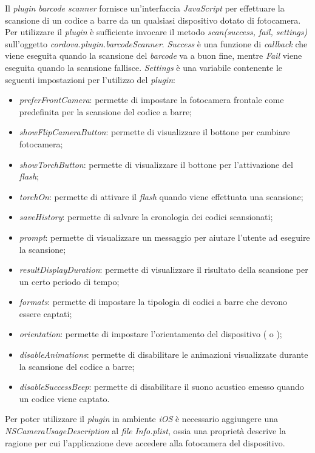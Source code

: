 Il \textit{plugin} \textit{barcode scanner} fornisce un'interfaccia \textit{JavaScript} per effettuare la scansione di un codice a barre da un qualsiasi dispositivo dotato di fotocamera. Per utilizzare il \textit{plugin} è sufficiente invocare il metodo \textit{scan(success, fail, settings)} sull'oggetto \textit{cordova.plugin.barcodeScanner}. \textit{Success} è una funzione di \textit{callback} che viene eseguita quando la scansione del \textit{barcode} va a buon fine, mentre \textit{Fail} viene eseguita quando la scansione fallisce. \textit{Settings} è una variabile contenente le seguenti impostazioni per l'utilizzo del \textit{plugin}:
\begin{itemize}
	\item \textit{preferFrontCamera}: permette di impostare la fotocamera frontale come predefinita per la scansione del codice a barre;
	\item \textit{showFlipCameraButton}: permette di visualizzare il bottone per cambiare fotocamera;
	\item \textit{showTorchButton}: permette di visualizzare il bottone per l'attivazione del \textit{flash};
	\item \textit{torchOn}: permette di attivare il \textit{flash} quando viene effettuata una scansione;
	\item \textit{saveHistory}: permette di salvare la cronologia dei codici scansionati;
	\item \textit{prompt}: permette di visualizzare un messaggio per aiutare l'utente ad eseguire la scansione;
	\item \textit{resultDisplayDuration}: permette di visualizzare il risultato della scansione per un certo periodo di tempo;
	\item \textit{formats}: permette di impostare la tipologia di codici a barre che devono essere captati;
	\item \textit{orientation}: permette di impostare l'orientamento del dispositivo ( o );
	\item \textit{disableAnimations}: permette di disabilitare le animazioni visualizzate durante la scansione del codice a barre;
	\item \textit{disableSuccessBeep}: permette di disabilitare il suono acustico emesso quando un codice viene captato.
\end{itemize}
Per poter utilizzare il \textit{plugin} in ambiente \textit{iOS} è necessario aggiungere una \textit{NSCameraUsageDescription} al \textit{file} \textit{Info.plist}, ossia una proprietà descrive la ragione per cui l'applicazione deve accedere alla fotocamera del dispositivo.

